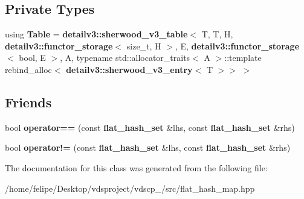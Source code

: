 \subsection*{Private Types}
\begin{DoxyCompactItemize}
\item 
using {\bfseries Table} = {\bf detailv3\+::sherwood\+\_\+v3\+\_\+table}$<$ T, T, H, {\bf detailv3\+::functor\+\_\+storage}$<$ size\+\_\+t, H $>$, E, {\bf detailv3\+::functor\+\_\+storage}$<$ bool, E $>$, A, typename std\+::allocator\+\_\+traits$<$ A $>$\+::template rebind\+\_\+alloc$<$ {\bf detailv3\+::sherwood\+\_\+v3\+\_\+entry}$<$ T $>$$>$ $>$\label{classska_1_1flat__hash__set_a737da60f812c6fc7ee564d692c7ec0ec}

\end{DoxyCompactItemize}
\subsection*{Friends}
\begin{DoxyCompactItemize}
\item 
bool {\bfseries operator==} (const {\bf flat\+\_\+hash\+\_\+set} \&lhs, const {\bf flat\+\_\+hash\+\_\+set} \&rhs)\label{classska_1_1flat__hash__set_a983dec7661d28492024dc5f4fc5c05d9}

\item 
bool {\bfseries operator!=} (const {\bf flat\+\_\+hash\+\_\+set} \&lhs, const {\bf flat\+\_\+hash\+\_\+set} \&rhs)\label{classska_1_1flat__hash__set_a978a1892e7a55293cc37ad445d7e9978}

\end{DoxyCompactItemize}


The documentation for this class was generated from the following file\+:\begin{DoxyCompactItemize}
\item 
/home/felipe/\+Desktop/vdsproject/vdscp\+\_/src/flat\+\_\+hash\+\_\+map.\+hpp\end{DoxyCompactItemize}
